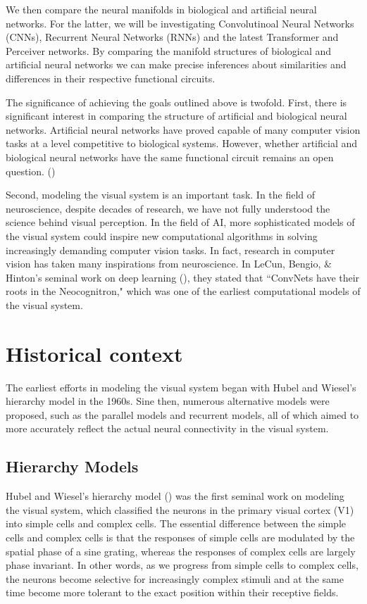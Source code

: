 \par We then compare the neural manifolds in biological and artificial neural networks. For the latter, we will be investigating Convolutinoal Neural Networks (CNNs), Recurrent Neural Networks (RNNs) and the latest Transformer and Perceiver networks. By comparing the manifold structures of biological and artificial neural networks we can make precise inferences about similarities and differences in their respective functional circuits.
  
\par The significance of achieving the goals outlined above is twofold. First, there is significant interest in comparing the structure of artificial and biological neural networks. Artificial neural networks have proved capable of many computer vision tasks at a level competitive to biological systems. However, whether artificial and biological neural networks have the same functional circuit remains an open question. (\cite{Gwilliams221630}) 

\par Second, modeling the visual system is an important task. In the field of neuroscience, despite decades of research, we have not fully understood the science behind visual perception. In the field of AI, more sophisticated models of the visual system could inspire new computational algorithms in solving increasingly demanding computer vision tasks. In fact, research in computer vision has taken many inspirations from neuroscience. In LeCun, Bengio, \& Hinton's seminal work on deep learning (\cite{lecun_deep_2015}), they stated that ``ConvNets have their roots in the Neocognitron," which was one of the earliest computational models of the visual system. 

\section{Historical context}

\par The earliest efforts in modeling the visual system began with Hubel and Wiesel's hierarchy model in the 1960s. Sine then, numerous alternative models were proposed, such as the parallel models and recurrent models, all of which aimed to more accurately reflect the actual neural connectivity in the visual system. 

\subsection{Hierarchy Models}
\par Hubel and Wiesel's hierarchy model (\cite{hubel_receptive_1962}) was the first seminal work on modeling the visual system, which classified the neurons in the primary visual cortex (V1) into simple cells and complex cells. The essential difference between the simple cells and complex cells is that the responses of simple cells are modulated by the spatial phase of a sine grating, whereas the responses of complex cells are largely phase invariant. In other words, as we progress from simple cells to complex cells, the neurons become selective for increasingly complex stimuli and at the same time become more tolerant to the exact position within their receptive fields. 

